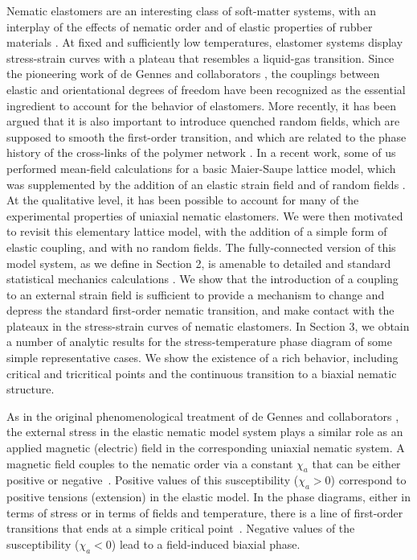 \documentclass[aps,pre,reprint,amsmath,amssymbols,superscriptaddress,
nofootinbib]{revtex4-1}
\begin{document}
Nematic elastomers are an interesting class of soft-matter systems, with an
interplay of the effects of nematic order and of elastic properties of
rubber materials \cite{Warner2003}. At fixed and sufficiently low
temperatures, elastomer systems display stress-strain curves with a plateau
that resembles a liquid-gas transition. Since the pioneering work of de Gennes and
collaborators \cite{deGennes1975,deGennesProst1993,deGennesOkumura2003},
the couplings between elastic and orientational degrees of freedom have been
recognized as the essential ingredient to account for the behavior of elastomers.
More recently, it has been argued that it is also important to introduce quenched
random fields, which are supposed to smooth the first-order transition, and which
are related to the phase history of the cross-links of the polymer network
\cite{Fridrikh1997,Yu1998,Selinger2002,Selinger2004,Fridrich2006,Petridis2006,
Zhu2011}. In a recent work, some of us performed mean-field
calculations for a basic Maier-Saupe lattice model, which was supplemented by
the addition of an elastic strain field and of random fields \cite{Liarte2011,
Liarte2013}. At the qualitative level, it has been possible to account
for many of the experimental properties of uniaxial nematic elastomers. We
were then motivated to revisit this elementary lattice model, with the
addition of a simple form of elastic coupling, and with no random fields. The
fully-connected version of this model system, as we define in Section 2, is
amenable to detailed and standard statistical mechanics calculations
\cite{doCarmo2011,Liarte2014}. We show that the introduction of a
coupling to an external strain field is sufficient to provide a mechanism to
change and depress the standard first-order nematic transition, and make contact
with the plateaux in the stress-strain curves of nematic elastomers. In Section 3,
we obtain a number of analytic results for the stress-temperature phase
diagram of some simple representative cases. We show the existence of a rich
behavior, including critical and tricritical points and the continuous
transition to a biaxial nematic structure.

As in the original phenomenological treatment of de Gennes and collaborators
\cite{deGennesOkumura2003}, the external stress in the elastic nematic model
system plays a similar role as an applied magnetic (electric) field in the
corresponding uniaxial nematic system. A magnetic field couples to the nematic
order via a constant $\chi_{a}$ that can be either positive or
negative~\cite{deGennesProst1993}. Positive values of this susceptibility
($\chi_{a}>0$) correspond to positive tensions (extension) in the elastic
model. In the phase diagrams, either in terms of stress or in terms of fields
and temperature, there is a line of first-order transitions that ends at a
simple critical point~\cite{Petri2016}. Negative values of the susceptibility
($\chi_{a}<0$) lead to a field-induced biaxial phase.
\end{document}
